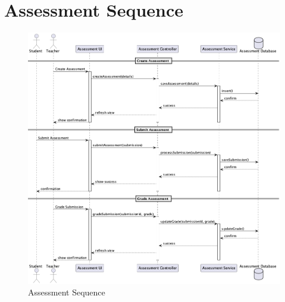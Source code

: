 \documentclass[12pt,a4paper]{report}
\begin{document}
\section{Assessment Sequence}
\begin{figure}[htbp]
    \centering
    \includegraphics[width=1\textwidth]{assessment-sequence.png}
    \caption{Assessment Sequence}
    \label{fig:assessment-sequence}
\end{figure}
\end{document}
